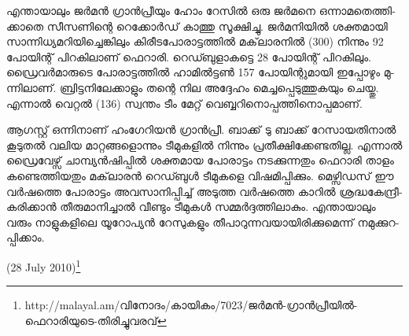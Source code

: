 എ­ന്താ­യാ­ലും ജര്‍­മന്‍ ഗ്രാന്‍­പ്രീ­യും ഹോം റേ­സില്‍ ഒരു ജര്‍­മ­നെ ഒന്നാ­മ­തെ­ത്തി­ക്കാ­തെ സീ­സ­ണി­ന്റെ റെ­ക്കോര്‍­ഡ് കാ­ത്തു 
സൂ­ക്ഷി­ച്ചു. ജര്‍­മ­നി­യില്‍ ശക്ത­മാ­യി സാ­ന്നി­ധ്യ­മ­റി­യി­ച്ചെ­ങ്കി­ലും കി­രീ­ട­പോ­രാ­ട്ട­ത്തില്‍ മക്‌­ലാ­ര­നില്‍ (300) നി­ന്നും 92 
പോ­യി­ന്റ് പി­റ­കി­ലാ­ണ് ഫെ­റാ­രി. റെ­ഡ്ബു­ളാ­ക­ട്ടെ 28 പോ­യി­ന്റ് പി­റ­കി­ലും. ഡ്രൈ­വര്‍­മാ­രു­ടെ പോ­രാ­ട്ട­ത്തില്‍ 
ഹാ­മില്‍­ട്ടണ്‍ 157 പോ­യി­ന്റു­മാ­യി ഇപ്പോ­ഴും മു­ന്നി­ലാ­ണ്. ബ്രി­ട്ട­നി­ലേ­ക്കാ­ളും തന്റെ നില അദ്ദേ­ഹം മെ­ച്ച­പ്പെ­ടു­ത്തു­ക­യും 
ചെ­യ്തു. എന്നാല്‍ വെ­റ്റല്‍ (136) സ്വ­ന്തം ടീം മേ­റ്റ് വെ­ബ്ബ­റി­നൊ­പ്പ­ത്തി­നൊ­പ്പ­മാ­ണ്.

ആ­ഗ­സ്റ്റ് ഒന്നി­നാ­ണ് ഹം­ഗേ­റി­യന്‍ ഗ്രാന്‍­പ്രീ. ബാ­ക്ക് ടു ബാ­ക്ക് റേ­സാ­യ­തി­നാല്‍ കൂ­ടു­തല്‍ വലിയ മാ­റ്റ­ങ്ങ­ളൊ­ന്നും 
ടീ­മു­ക­ളില്‍ നി­ന്നും പ്ര­തീ­ക്ഷി­ക്കേ­ണ്ട­തി­ല്ല. എന്നാല്‍ ഡ്രൈ­വേ­ഴ്സ് ചാ­മ്പ്യന്‍­ഷി­പ്പില്‍ ശക്ത­മായ പോ­രാ­ട്ടം നട­ക്കു­ന്ന­തും ഫെ­റാ­രി 
താ­ളം കണ്ടെ­ത്തി­യ­തും മക്‌­ലാ­രന്‍ ­റെ­ഡ്ബുള്‍ ടീ­മു­ക­ളെ വി­ഷ­മി­പ്പി­ക്കും. ­മെ­ഴ്സി­ഡ­സ് ഈ വര്‍­ഷ­ത്തെ പോ­രാ­ട്ടം 
അവ­സാ­നി­പ്പി­ച്ച് അടു­ത്ത വര്‍­ഷ­ത്തെ കാ­റില്‍ ശ്ര­ദ്ധ­കേ­ന്ദ്രീ­ക­രി­ക്കാന്‍ തീ­രു­മാ­നി­ച്ചാല്‍ വീ­ണ്ടും ടീ­മു­കള്‍ സമ്മര്‍­ദ്ദ­ത്തി­ലാ­കും.
എന്താ­യാ­ലും വരും നാ­ളു­ക­ളി­ലെ യൂ­റോ­പ്യന്‍ റേ­സു­ക­ളും തീ­പാ­റു­ന്ന­വ­യാ­യി­രി­ക്കു­മെ­ന്ന് നമു­ക്കു­റ­പ്പി­ക്കാം­.

(28 July 2010)\footnote{http://malayal.am/വിനോദം/കായികം/7023/ജര്‍മന്‍-ഗ്രാന്‍പ്രീയില്‍-ഫെറാരിയുടെ-തിരിച്ചുവരവ്}

\newpage
